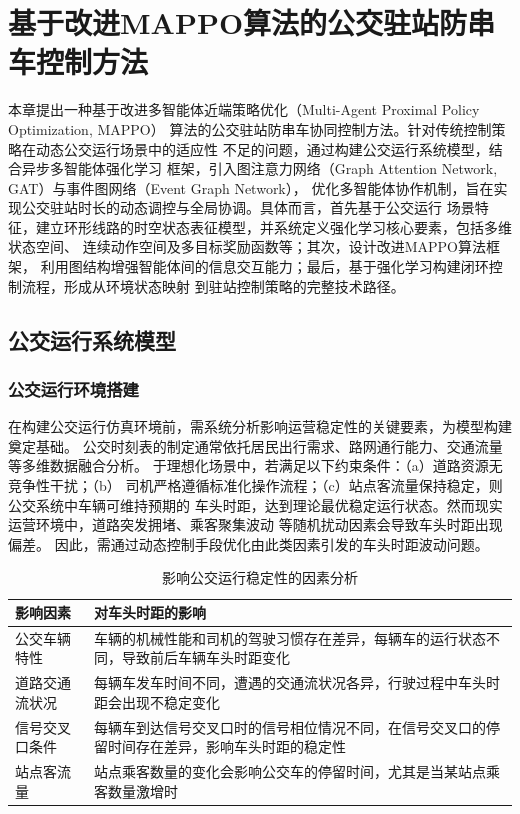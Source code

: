 \chapter{基于改进MAPPO算法的公交驻站防串车控制方法}\label{第3章}
本章提出一种基于改进多智能体近端策略优化（Multi-Agent Proximal Policy Optimization, MAPPO）
算法的公交驻站防串车协同控制方法。针对传统控制策略在动态公交运行场景中的适应性
不足的问题，通过构建公交运行系统模型，结合异步多智能体强化学习
框架，引入图注意力网络（Graph Attention Network, GAT）与事件图网络（Event Graph Network），
优化多智能体协作机制，旨在实现公交驻站时长的动态调控与全局协调。具体而言，首先基于公交运行
场景特征，建立环形线路的时空状态表征模型，并系统定义强化学习核心要素，包括多维状态空间、
连续动作空间及多目标奖励函数等；其次，设计改进MAPPO算法框架，
利用图结构增强智能体间的信息交互能力；最后，基于强化学习构建闭环控制流程，形成从环境状态映射
到驻站控制策略的完整技术路径。
\section{公交运行系统模型}
\subsection{公交运行环境搭建}
在构建公交运行仿真环境前，需系统分析影响运营稳定性的关键要素，为模型构建奠定基础。
公交时刻表的制定通常依托居民出行需求、路网通行能力、交通流量等多维数据融合分析。
于理想化场景中，若满足以下约束条件：（a）道路资源无竞争性干扰；（b）
司机严格遵循标准化操作流程；（c）站点客流量保持稳定，则公交系统中车辆可维持预期的
车头时距，达到理论最优稳定运行状态。然而现实运营环境中，道路突发拥堵、乘客聚集波动
等随机扰动因素会导致车头时距出现偏差。
因此，需通过动态控制手段优化由此类因素引发的车头时距波动问题。
\begin{table}[htbp]
\centering
\caption{影响公交运行稳定性的因素分析}
\label{tab3-0}
\begin{tabular}{>{\centering\arraybackslash}m{3cm} >{\centering\arraybackslash}m{10cm}}
\toprule
\textbf{影响因素}  & \textbf{对车头时距的影响}\\
\midrule
公交车辆特性 & 车辆的机械性能和司机的驾驶习惯存在差异，每辆车的运行状态不同，导致前后车辆车头时距变化\\
道路交通流状况 & 每辆车发车时间不同，遭遇的交通流状况各异，行驶过程中车头时距会出现不稳定变化 \\
信号交叉口条件 & 每辆车到达信号交叉口时的信号相位情况不同，在信号交叉口的停留时间存在差异，影响车头时距的稳定性 \\
站点客流量 & 站点乘客数量的变化会影响公交车的停留时间，尤其是当某站点乘客数量激增时 \\
\bottomrule
\end{tabular}
\end{table}

